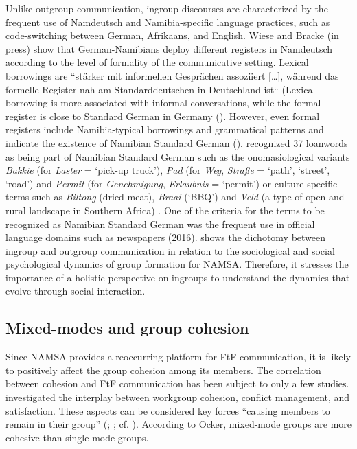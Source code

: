 \documentclass[output=paper]{langsci/langscibook}
\begin{document}
Unlike outgroup communication, ingroup discourses are characterized by the frequent use of Namdeutsch and Namibia-specific language practices, such as code-switching between German, Afrikaans, and English. Wiese and Bracke (in press) show that German-Namibians deploy different registers in Namdeutsch according to the level of formality of the communicative setting. Lexical borrowings are “stärker mit informellen Gesprächen assoziiert […], während das formelle Register nah am Standarddeutschen in Deutschland ist“ (Lexical borrowing is more associated with informal conversations, while the formal register is close to Standard German in Germany (\citealt[14]{wiese_registerdifferenzierung_2021}). However, even formal registers include Namibia-typical borrowings and grammatical patterns and indicate the existence of Namibian Standard German (\citealt{wiese_registerdifferenzierung_2021}). \citet{ammon_variantenworterbuch_2016} recognized 37 loanwords as being part of Namibian Standard German such as the onomasiological variants  \textit{Bakkie} (for \textit{Laster} = ‘pick-up truck’), \textit{Pad} (for   \textit{Weg}, \textit{Straße}  = ‘path’, ‘street’, ‘road’) and \textit{Permit}  (for \textit{Genehmigung}, \textit{Erlaubnis} = ‘permit’) or culture-specific terms such as \textit{Biltong} (dried meat),  \textit{Braai} (‘BBQ’) and \textit{Veld}   (a type of open and rural landscape in Southern Africa) \citep[206--207]{hausler_zur_2017}. One of the criteria for the terms to be recognized as Namibian Standard German was the frequent use in official language domains such as newspapers (2016).  shows the dichotomy between ingroup and outgroup communication in relation to the sociological and social psychological dynamics of group formation for NAMSA. Therefore, it stresses the importance of a holistic perspective on ingroups to understand the dynamics that evolve through social interaction.
  

 
   
\subsection{Mixed-modes and group cohesion}
 \label{sec:radke:3.3}
 

Since NAMSA provides a reoccurring platform for FtF communication, it is likely to positively affect the group cohesion among its members. The correlation between cohesion and FtF communication has been subject to only a few studies. \citet{ocker_mediating_2002} investigated the interplay between workgroup cohesion, conflict management, and satisfaction. These aspects can be considered key forces “causing members to remain in their group” (\citealt[246]{carron_development_1985}; \citealt[276]{brawley_assessing_1987}; cf. \citealt{festinger_social_1950}). According to Ocker, mixed-mode groups are more cohesive than single-mode groups.
\end{document}
